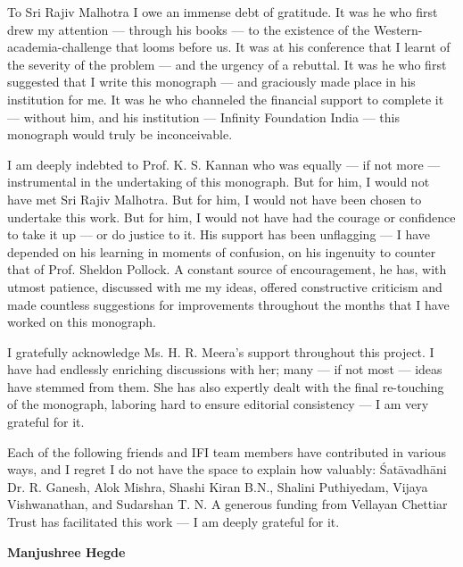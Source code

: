To Sri Rajiv Malhotra I owe an immense debt of gratitude. It was he who first drew my attention --- through his books --- to the existence of the Western-academia-challenge that looms before us. It was at his conference that I learnt of the severity of the problem --- and the urgency of a rebuttal. It was he who first suggested that I write this monograph --- and graciously made place in his institution for me. It was he who channeled the financial support to complete it --- without him, and his institution --- Infinity Foundation India --- this monograph would truly be inconceivable.   

I am deeply indebted to Prof. K. S. Kannan who was equally --- if not more --- instrumental in the undertaking of this monograph. But for him, I would not have met Sri Rajiv Malhotra. But for him, I would not have been chosen to undertake this work. But for him, I would not have had the courage or confidence to take it up --- or do justice to it. His support has been unflagging --- I have depended on his learning in moments of confusion, on his ingenuity to counter that of Prof. Sheldon Pollock. A constant source of encouragement, he has, with utmost patience, discussed with me my ideas, offered constructive criticism and made countless suggestions for improvements throughout the months that I have worked on this monograph.  

I gratefully acknowledge Ms. H. R. Meera’s support throughout this project. I have had endlessly enriching discussions with her; many --- if not most --- ideas have stemmed from them.  She has also expertly dealt with the final re-touching of the monograph, laboring hard to ensure editorial consistency --- I am very grateful for it. 

\newpage

Each of the following friends and IFI team members have contributed in various ways, and I regret I do not have the space to explain how valuably: Śatāvadhāni Dr. R. Ganesh, Alok Mishra, Shashi Kiran B.N., Shalini Puthiyedam, Vijaya Vishwanathan, and Sudarshan T. N. A generous funding from Vellayan Chettiar Trust has facilitated this work --- I am deeply grateful for it. 


\bigskip
\hfill {\bf Manjushree Hegde}

